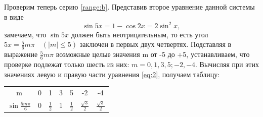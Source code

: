 \documentclass[14pt]{extarticle}
\begin{document}
Проверим теперь серию \ref{range:b}{}. Представив второе уравнение данной системы в виде
\begin{equation}\label{eq:2}
\sin5x = 1 - \cos2x = 2\sin^2 x,
\end{equation}
замечаем, что \(\sin 5x\) должен быть неотрицательным, то есть угол \(5x=\frac{5}{6}m\pi \quad (|m|\leq 5)\) заключен в первых двух четвертях. Подставляя в выражение \(\frac{5}{6}m\pi\) возможные целые значения m от -5 до +5, устанавливаем, что проверке подлежат только шесть из них: \(m=0, 1, 3, 5; -2, -4\). Вычисляя при этих значениях левую и правую части уравнения \ref{eq:2}, получаем таблицу:

\begin{tabular}{ |c|c|c|c|c|c|c| } 
    \hline
    m & 0 & 1 & 3 & 5 & -2 & -4 \\
    \(\sin{\frac{5m\pi}{6}}\) & 0 & \(\frac{1}{2}\) & 1 & \(\frac{1}{2}\) & \(\frac{\sqrt{3}}{2}\) & \(\frac{\sqrt{3}}{2}\) \\
    \hline
\end{tabular}

\end{document}
